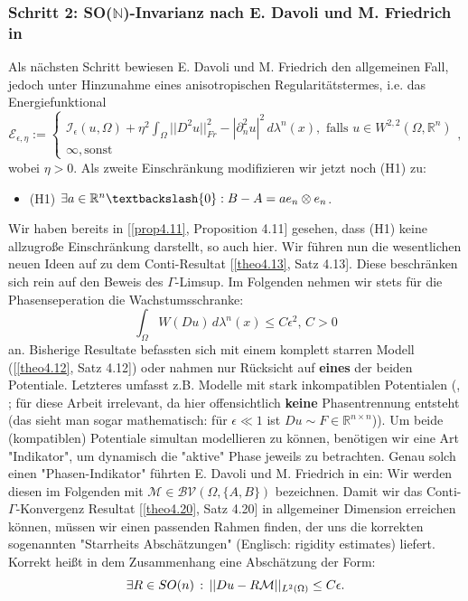 \subsubsection{Schritt 2: SO(\(\mathbb{N}\))-Invarianz nach E. Davoli und M. Friedrich in \cite{davoli2020two}}
Als nächsten Schritt bewiesen E. Davoli und M. Friedrich den allgemeinen Fall, jedoch unter Hinzunahme eines anisotropischen Regularitätstermes, i.e. das Energiefunktional
\begin{equation}
    \mathcal{E}_{\epsilon,\eta} := \begin{cases}
        \mathcal{I}_{\epsilon} (u,\Omega) + \eta^2 \int_{\Omega} ||D^2 u||_{Fr}^2 - |\partial_n^2 u|^2 \,d\lambda^n(x), \text{ falls }u \in W^{2,2}(\Omega,\mathbb{R}^n) \\
        \infty, \text{sonst}
    \end{cases},
\end{equation}
wobei \(\eta > 0\). Als zweite Einschränkung modifizieren wir jetzt noch (H1) zu:
\begin{itemize}
    \item (H1) \(\exists a \in \mathbb{R}^n \textbackslash \{0\} : B - A = a e_n \otimes e_n\).
\end{itemize}
Wir haben bereits in [\ref{prop4.11}, Proposition 4.11] gesehen, dass (H1) keine allzugroße Einschränkung darstellt, so auch hier. Wir führen nun die wesentlichen neuen Ideen auf zu dem Conti-Resultat [\ref{theo4.13}, Satz 4.13]. Diese beschränken sich rein auf den Beweis des \(\Gamma\)-Limsup. Im Folgenden nehmen wir stets für die Phasenseperation die Wachstumsschranke:
\begin{equation}
    \int_{\Omega} W(Du) \,d\lambda^n(x) \leq C \epsilon^2, \, C > 0
\end{equation}
an. Bisherige Resultate befassten sich mit einem komplett starren Modell ([\ref{theo4.12}, Satz 4.12]) oder nahmen nur Rücksicht auf \textbf{eines} der beiden Potentiale. Letzteres umfasst z.B. Modelle mit stark inkompatiblen Potentialen (\cite{de2006simple}, \cite{chaudhuri2004rigidity}; für diese Arbeit irrelevant, da hier offensichtlich \textbf{keine} Phasentrennung entsteht (das sieht man sogar mathematisch: für \(\epsilon \ll 1\) ist \(Du \sim F \in \mathbb{R}^{n \times n}\))). Um beide (kompatiblen) Potentiale simultan modellieren zu können, benötigen wir eine Art "Indikator", um dynamisch die "aktive" Phase jeweils zu betrachten. Genau solch einen "Phasen-Indikator" führten E. Davoli und M. Friedrich in \cite{davoli2020two} ein: Wir werden diesen im Folgenden mit \(\mathcal{M} \in \mathcal{BV}(\Omega, \{A,B\})\) bezeichnen. Damit wir das Conti-\(\Gamma\)-Konvergenz Resultat [\ref{theo4.20}, Satz 4.20] in allgemeiner Dimension erreichen können, müssen wir einen passenden Rahmen finden, der uns die korrekten sogenannten "Starrheits Abschätzungen" (Englisch: rigidity estimates) liefert. Korrekt heißt in dem Zusammenhang eine Abschätzung der Form:
\begin{equation}{\label{eq4.138}}
    \exists R \in SO(n) \, : \, ||Du - R\mathcal{M}||_{L^2(\Omega)} \leq C \epsilon.
\end{equation}

